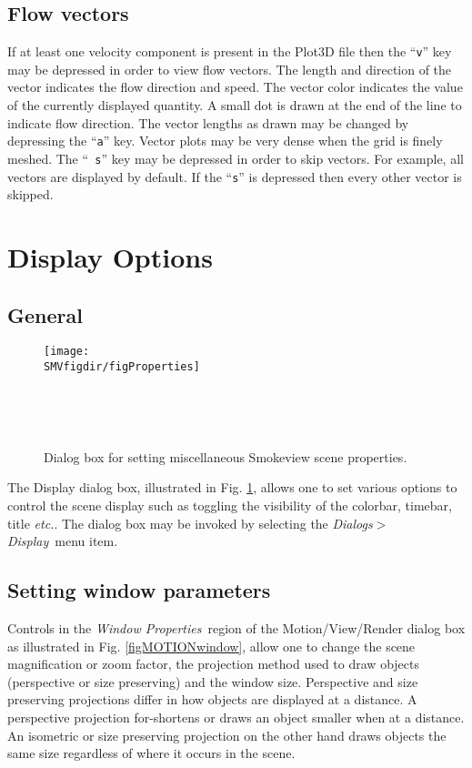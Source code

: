 \documentclass[11pt,twoside]{book}
\begin{document}
\subsection{Flow vectors}If at least one velocity component is present in the Plot3D
file then the ``{\tt v}'' key may be depressed in order to view
flow  vectors. The length and direction of the vector indicates
the flow direction and speed. The vector color indicates the value
of the currently displayed quantity. A small dot is drawn at the
end of the line to indicate flow direction. The vector lengths as
drawn may be changed by depressing the ``{\tt a}'' key. Vector
plots may be very dense when the grid is finely meshed. The ``{\tt
s}'' key may be depressed in order to skip vectors.  For example,
all vectors are displayed by default.  If the ``{\tt s}'' is
depressed then every other vector is skipped.

\section{Display Options}
\subsection{General}
\begin{figure}[bph]
\centerline{\texttt{[image: \\SMVfigdir/figProperties]}
}\ \caption [Dialog box for setting miscellaneous Smokeview scene
properties.] {Dialog box for setting miscellaneous Smokeview scene
properties.}\ \label{figProperties}
\end{figure}
The Display dialog box, illustrated in Fig.
\ref{figProperties}, allows one to set various options to control
the scene display such as toggling the visibility of the colorbar, timebar, title {\em etc.}.  The  dialog box may be
invoked by selecting the {\em Dialogs$>$Display}\ menu item.

\subsection{Setting window parameters}
Controls in the {\em Window Properties}\ region of the Motion/View/Render dialog box as illustrated in Fig. \ref{figMOTIONwindow},
allow one to change the scene magnification or zoom factor, the
projection method used to draw objects (perspective or size preserving) and the window size.
Perspective and size preserving projections differ in how objects are displayed
at a distance.  A perspective projection for-shortens or draws an
object smaller when at a distance. An isometric or size preserving projection
on the other hand draws objects the same size regardless of
where it occurs in the scene.
\end{document}
